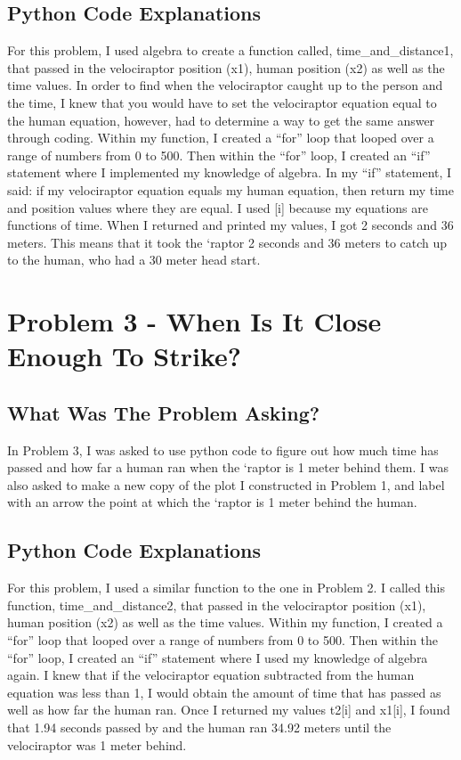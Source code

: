 \documentclass[twocolumn]{revtex4}
\begin{document}
\subsection{Python Code Explanations}
For this problem, I used algebra to create a function called, time\_and\_distance1, that passed in the velociraptor position (x1), human position (x2) as well as the time values. In order to find when the velociraptor caught up to the person and the time, I knew that you would have to set the velociraptor equation equal to the human equation, however, had to determine a way to get the same answer through coding. Within my function, I created a ``for'' loop that looped over a range of numbers from 0 to 500. Then within the ``for'' loop, I created an ``if'' statement where I implemented my knowledge of algebra. In my ``if'' statement, I said: if my velociraptor equation equals my human equation, then return my time and position values where they are equal. I used [i] because my equations are functions of time. When I returned and printed my values, I got 2 seconds and 36 meters. This means that it took the `raptor 2 seconds and 36 meters to catch up to the human, who had a 30 meter head start.



\section{Problem 3 - When Is It Close Enough To Strike?}
\subsection{What Was The Problem Asking?}
In Problem 3, I was asked to use python code to figure out how much time has passed and how far a human ran when the `raptor is 1 meter behind them. I was also asked to make a new copy of the plot I constructed in Problem 1, and label with an arrow the point at which the `raptor is 1 meter behind the human.

\subsection{Python Code Explanations}
For this problem, I used a similar function to the one in Problem 2. I called this function, time\_and\_distance2, that passed in the velociraptor position (x1), human position (x2) as well as the time values. Within my function, I created a ``for'' loop that looped over a range of numbers from 0 to 500. Then within the ``for'' loop, I created an ``if'' statement where I used my knowledge of algebra again. I knew that if the velociraptor equation subtracted from the human equation was less than 1, I would obtain the amount of time that has passed as well as how far the human ran. Once I returned my values t2[i] and x1[i], I found that 1.94 seconds passed by and the human ran 34.92 meters until the velociraptor was 1 meter behind.
\end{document}

